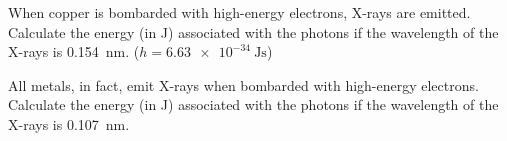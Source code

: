 \documentclass[notes=onlyslideswithnotes,notes=hide]{beamer}
\begin{document}

\begin{inclass}
	\parbox[t][14em]{\linewidth}{
	When copper is bombarded with high-energy electrons, X-rays are emitted.
	Calculate the energy (in \si{\joule}) associated with the photons if the
	wavelength of the X-rays is \SI{0.154}{\nano\meter}. ($h =
	\SI{6.63e-34}{\joule\second}$)}


\end{inclass}

\begin{onyourown}%
	All metals, in fact, emit X-rays when bombarded with high-energy
	electrons. Calculate the energy (in \si{\joule}) associated with the photons if
	the wavelength of the X-rays is \SI{0.107}{\nano\meter}.
\end{onyourown}

\clearpage
\end{document}
